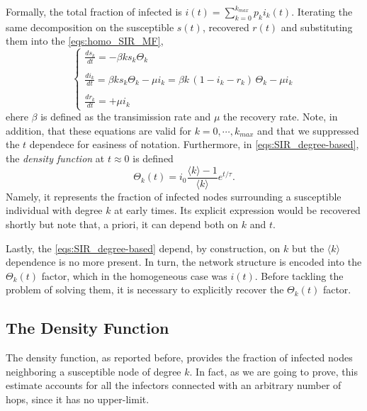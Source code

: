 \documentclass[a4paper,10pt,twoside]{book} %
\theoremstyle{definition}
\begin{document}
Formally, the total fraction of infected is $i(t) = \sum_{k=0}^{k_{max}} p_k i_k(t)$. Iterating the same decomposition on the susceptible $ s(t)$, recovered $ r(t)$ and substituting them into the \autoref{eqs:homo_SIR_MF},
\begin{equation}
	\begin{cases}
		\frac{ds_k}{dt} = -\beta  k  s_k \Theta_k \\ \\ 
		\frac{di_k}{dt} = \beta  k  s_k \Theta_k - \mu i_k = \beta  k  \, (1-i_k-r_k) \, \Theta_k -\mu i_k \label{eqs:SIR_degree-based} \\ \\
		\frac{dr_k}{dt} = +\mu i_k
	\end{cases}	
\end{equation}
ehere $ \beta$ is defined as the transimission rate and $ \mu$ the recovery rate.
Note, in addition, that these equations are valid for $k = 0,\cdots,k_{max}$ and that we suppressed the $t$ dependece for easiness of notation.
Furthermore, in \autoref{eqs:SIR_degree-based}, the \textit{density function} at $ t \approx 0$ is defined
\begin{equation}
	\Theta_k(t) = i_0 \frac{\langle k \rangle - 1}{\langle k \rangle} e^{t/\tau}.
\end{equation}
Namely, it represents the fraction of infected nodes surrounding a susceptible individual with degree $k$ at early times. Its explicit expression would be recovered shortly but note that, a priori, it can depend both on $k$ and $t$.

Lastly, the \autoref{eqs:SIR_degree-based} depend, by construction, on $k$ but the $\langle k \rangle$ dependence is no more present. In turn, the network structure is encoded into the $\Theta_k(t)$ factor, which in the homogeneous case was $i(t)$.
Before tackling the problem of solving them, it is necessary to explicitly recover the $\Theta_k(t)$ factor.

\subsection*{The Density Function}
The density function, as reported before, provides the fraction of infected nodes neighboring a susceptible node of degree $k$. In fact, as we are going to prove, this estimate accounts for all the infectors connected with an arbitrary number of hops, since it has no upper-limit. 
\end{document}
